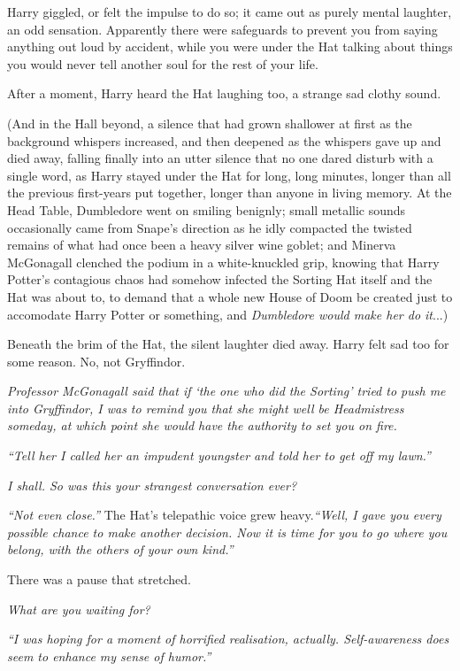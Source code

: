 Harry giggled, or felt the impulse to do so; it came out as purely
mental laughter, an odd sensation. Apparently there were safeguards to
prevent you from saying anything out loud by accident, while you were
under the Hat talking about things you would never tell another soul for
the rest of your life.

After a moment, Harry heard the Hat laughing too, a strange sad clothy
sound.

(And in the Hall beyond, a silence that had grown shallower at first as
the background whispers increased, and then deepened as the whispers
gave up and died away, falling finally into an utter silence that no one
dared disturb with a single word, as Harry stayed under the Hat for
long, long minutes, longer than all the previous first-years put
together, longer than anyone in living memory. At the Head Table,
Dumbledore went on smiling benignly; small metallic sounds occasionally
came from Snape's direction as he idly compacted the twisted remains of
what had once been a heavy silver wine goblet; and Minerva McGonagall
clenched the podium in a white-knuckled grip, knowing that Harry
Potter's contagious chaos had somehow infected the Sorting Hat itself
and the Hat was about to, to demand that a whole new House of Doom be
created just to accomodate Harry Potter or something, and
\emph{Dumbledore would make her do it}...)

Beneath the brim of the Hat, the silent laughter died away. Harry felt
sad too for some reason. No, not Gryffindor.

\emph{Professor McGonagall said that if `the one who did the Sorting'
tried to push me into Gryffindor, I was to remind you that she might
well be Headmistress someday, at which point she would have the
authority to set you on fire.}

\emph{``Tell her I called her an impudent youngster and told her to get
off my lawn.''}

\emph{I shall. So was this your strangest conversation ever?}

\emph{``Not even close.''} The Hat's telepathic voice grew
heavy.\emph{``Well, I gave you every possible chance to make another
decision. Now it is time for you to go where you belong, with the others
of your own kind.''}

There was a pause that stretched.

\emph{What are you waiting for?}

\emph{``I was hoping for a moment of horrified realisation, actually.
Self-awareness does seem to enhance my sense of humor.''}

